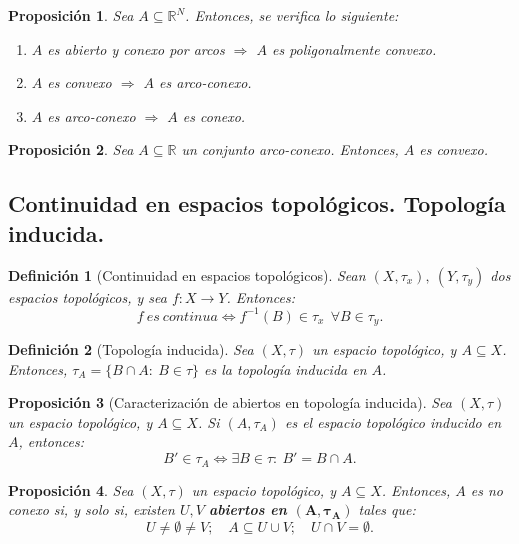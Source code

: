 \documentclass[11pt, a4paper, titlepage]{article}
\newcommand{\bm}[1]{\boldsymbol{#1}}
\theoremstyle{theorem-style}
\newtheorem*{nprop}{Proposición}
\theoremstyle{definition-style}
\newtheorem*{ndef}{Definición}
\theoremstyle{remark-style}
\theoremstyle{example-style}
\newenvironment{nlist}
{\begin{enumerate}
\renewcommand\labelenumi{(\emph{\roman{enumi})}}}
{\end{enumerate}}
\begin{document}
\begin{nprop}
Sea $A\subseteq \mathbb{R}^N$. Entonces, se verifica lo siguiente:

\begin{nlist}
\item $A$ es abierto y conexo por arcos $\Rightarrow$ $A$ es poligonalmente convexo.
\item $A$ es convexo $\Rightarrow$ $A$ es arco-conexo.
\item $A$ es arco-conexo $\Rightarrow$ $A$ es conexo.
\end{nlist}
\end{nprop}



\begin{nprop}
Sea $A\subseteq \mathbb{R}$ un conjunto arco-conexo. Entonces, $A$ es convexo.
\end{nprop}




\subsection{Continuidad en espacios topológicos. Topología inducida.}

\begin{ndef}[Continuidad en espacios topológicos]
Sean $(X,\tau_x),\ (Y,\tau_y)$ dos espacios topológicos, y sea $f:X\longrightarrow Y$. Entonces: $$f\ es\ continua \iff f^{-1}(B) \in \tau_x \ \ \forall B \in \tau_y.$$
\end{ndef}



\begin{ndef}[Topología inducida]
Sea $(X,\tau)$ un espacio topológico, y $A\subseteq X$. Entonces, $\tau_A = \{B\cap A: \ B \in \tau\}$ es la \textit{topología inducida en $A$}.
\end{ndef}



\begin{nprop}[Caracterización de abiertos en topología inducida]
Sea $(X,\tau)$ un espacio topológico, y $A\subseteq X$. Si $(A,\tau_A)$ es el espacio topológico inducido en $A$, entonces: $$B' \in \tau_A \iff \exists B\in \tau: \ B' = B\cap A.$$
\end{nprop}



\begin{nprop}
Sea $(X,\tau)$ un espacio topológico, y $A\subseteq X$. Entonces, $A$ es no conexo si, y solo si, existen $U,V$ \textbf{abiertos en $\bm{(A,\tau_A)}$} tales que: $$U \ne \emptyset \ne V;\quad A \subseteq U \cup V;\quad U \cap V = \emptyset.$$
\end{nprop}
\end{document}
